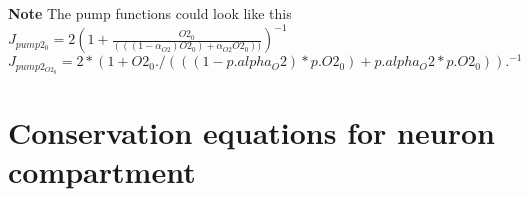 \documentclass[fleqn]{report}
\numberwithin{equation}{section}
\numberwithin{equation}{section}
\newcommand{\K}{\text{K$^+$}}
\begin{document}
\textbf{Note }
The pump functions could look like this \\
$                       J_{pump2_{0}}      = 2  (1 + \frac{O2_{0}}{(((1 - \alpha_{O2}) O2_{0} ) + \alpha_{O2}  O2_0))})^{-1}$\\
 $                      J_{pump2_{O2_{0}}}  =  2 * (1 + O2_{0} ./ (((1 - p.alpha_O2) * p.O2_0) + p.alpha_O2 * p.O2_0)).^{-1}$\\
 
            
             
%             
%             
%              
\section{Conservation equations for neuron compartment}

%            
\end{document}
